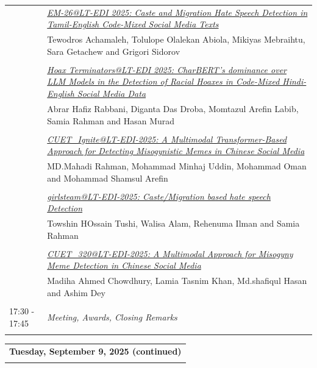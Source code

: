 \documentclass[11pt,oneside]{book}
\begin{document}
\begin{tabular}{p{24mm}p{124mm}}
                      & \hyperlink{page.152}{\emph{EM-26@LT-EDI 2025: Caste and Migration Hate Speech Detection in Tamil-English Code-Mixed Social Media Texts}}\\
        & Tewodros Achamaleh\index{Achamaleh}, Tolulope Olalekan Abiola\index{Abiola}, Mikiyas Mebraihtu\index{Mebraihtu}, Sara Getachew\index{Getachew} and Grigori Sidorov\index{Sidorov}\\\\
                
                      & \hyperlink{page.159}{\emph{Hoax Terminators@LT-EDI 2025: CharBERT's dominance over LLM Models in the Detection of Racial Hoaxes in Code-Mixed Hindi-English Social Media Data}}\\
        & Abrar Hafiz Rabbani\index{Rabbani}, Diganta Das Droba\index{Droba}, Momtazul Arefin Labib\index{Labib}, Samia Rahman\index{Rahman} and Hasan Murad\index{Murad}\\\\
                
                      & \hyperlink{page.171}{\emph{CUET\_Ignite@LT-EDI-2025: A Multimodal Transformer-Based Approach for Detecting Misogynistic Memes in Chinese Social Media}}\\
        & MD.Mahadi Rahman\index{Rahman}, Mohammad Minhaj Uddin\index{Uddin}, Mohammad Oman\index{Oman} and Mohammad Shamsul Arefin\index{Arefin}\\\\
                
                      & \hyperlink{page.177}{\emph{girlsteam@LT-EDI-2025: Caste/Migration based hate speech Detection}}\\
        & Towshin HOssain Tushi\index{Tushi}, Walisa Alam\index{Alam}, Rehenuma Ilman\index{Ilman} and Samia Rahman\index{Rahman}\\\\
                
                      & \hyperlink{page.183}{\emph{CUET\_320@LT-EDI-2025: A Multimodal Approach for Misogyny Meme Detection in Chinese Social Media}}\\
        & Madiha Ahmed Chowdhury\index{Chowdhury}, Lamia Tasnim Khan\index{Khan}, Md.shafiqul Hasan\index{Hasan} and Ashim Dey\index{Dey}\\\\
                      17:30 - 17:45 & \emph{Meeting, Awards, Closing Remarks}\\\\
      
              \end{tabular}
    \newpage
          \begin{tabular}{p{24mm}p{124mm}}
    \multicolumn{2}{l}{\bf Tuesday, September 9, 2025 (continued)} \\\\
        \end{tabular}
    \newpage
      
\end{document}
